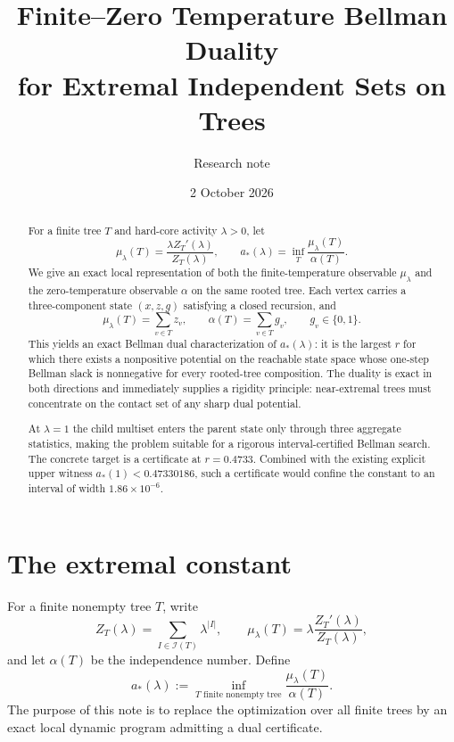 \documentclass[11pt,a4paper]{article}
\title{Finite--Zero Temperature Bellman Duality\\
for Extremal Independent Sets on Trees}
\author{Research note}
\date{2 October 2026}
\theoremstyle{definition}
\theoremstyle{remark}
\newcommand{\I}{\mathcal I}
\newcommand{\1}{\mathbf 1}
\begin{document}
\maketitle

\begin{abstract}
For a finite tree $T$ and hard-core activity $\lambda>0$, let
\[
  \mu_\lambda(T)=\frac{\lambda Z_T'(\lambda)}{Z_T(\lambda)},
  \qquad
  a_*(\lambda)=\inf_T \frac{\mu_\lambda(T)}{\alpha(T)}.
\]
We give an exact local representation of both the finite-temperature observable
$\mu_\lambda$ and the zero-temperature observable $\alpha$ on the same rooted tree.
Each vertex carries a three-component state $(x,z,g)$ satisfying a closed recursion,
and
\[
  \mu_\lambda(T)=\sum_{v\in T} z_v,
  \qquad
  \alpha(T)=\sum_{v\in T} g_v,
  \qquad g_v\in\{0,1\}.
\]
This yields an exact Bellman dual characterization of $a_*(\lambda)$: it is the largest
$r$ for which there exists a nonpositive potential on the reachable state space whose
one-step Bellman slack is nonnegative for every rooted-tree composition.  The duality
is exact in both directions and immediately supplies a rigidity principle: near-extremal
trees must concentrate on the contact set of any sharp dual potential.

At $\lambda=1$ the child multiset enters the parent state only through three aggregate
statistics, making the problem suitable for a rigorous interval-certified Bellman search.
The concrete target is a certificate at $r=0.4733$.  Combined with the existing explicit
upper witness $a_*(1)<0.47330186$, such a certificate would confine the constant to an
interval of width $1.86\times10^{-6}$.
\end{abstract}

\section{The extremal constant}

For a finite nonempty tree $T$, write
\[
  Z_T(\lambda)=\sum_{I\in\I(T)}\lambda^{|I|},
  \qquad
  \mu_\lambda(T)=\lambda\frac{Z_T'(\lambda)}{Z_T(\lambda)},
\]
and let $\alpha(T)$ be the independence number.  Define
\begin{equation}
  a_*(\lambda)
  :=\inf_{T\text{ finite nonempty tree}}
  \frac{\mu_\lambda(T)}{\alpha(T)}.
  \label{eq:astar}
\end{equation}
The purpose of this note is to replace the optimization over all finite trees by an exact
local dynamic program admitting a dual certificate.
\end{document}
